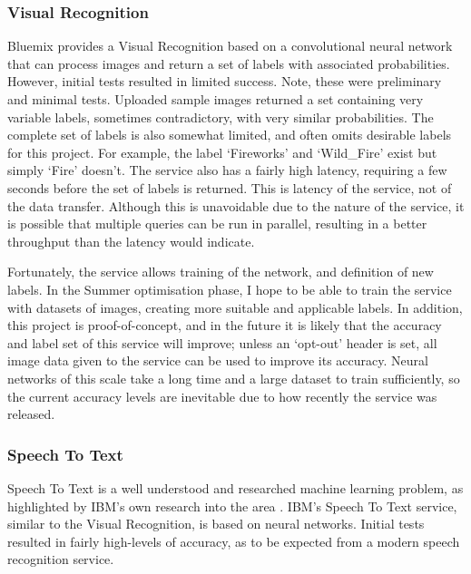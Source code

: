 \documentclass{article}
\begin{document}
\subsubsection{Visual Recognition}
Bluemix provides a Visual Recognition based on a convolutional neural network that can process images and return a set of labels with associated probabilities. However, initial tests resulted in limited success. Note, these were preliminary and minimal tests. Uploaded sample images returned a set containing very variable labels, sometimes contradictory, with very similar probabilities. The complete set of labels is also somewhat limited, and often omits desirable labels for this project. For example, the label `Fireworks' and `Wild\_Fire' exist but simply `Fire' doesn't. The service also has a fairly high latency, requiring a few seconds before the set of labels is returned. This is latency of the service, not of the data transfer. Although this is unavoidable due to the nature of the service, it is possible that multiple queries can be run in parallel, resulting in a better throughput than the latency would indicate.

\vspace{\baselineskip} \noindent
Fortunately, the service allows training of the network, and definition of new labels. In the Summer optimisation phase, I hope to be able to train the service with datasets of images, creating more suitable and applicable labels. In addition, this project is proof-of-concept, and in the future it is likely that the accuracy and label set of this service will improve; unless an `opt-out' header is set, all image data given to the service can be used to improve its accuracy. Neural networks of this scale take a long time and a large dataset to train sufficiently, so the current accuracy levels are inevitable due to how recently the service was released.

\subsubsection{Speech To Text}
Speech To Text is a well understood and researched machine learning problem, as highlighted by IBM's own research into the area \cite{Science}. IBM's Speech To Text service, similar to the Visual Recognition, is based on neural networks. Initial tests resulted in fairly high-levels of accuracy, as to be expected from a modern speech recognition service.
\end{document}
